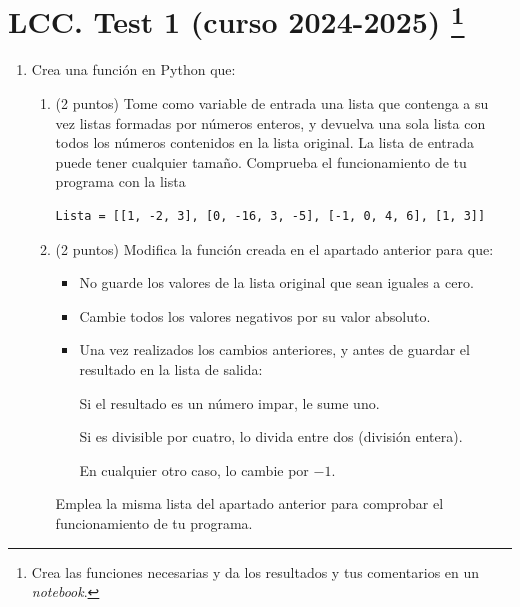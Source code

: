 \section{LCC. Test 1 (curso 2024-2025) \protect\footnote{Crea las funciones necesarias y da los resultados y tus comentarios en un \emph{notebook}.}}

\begin{enumerate}
	\item Crea una función en Python que:
	\begin{enumerate}
		\item (2 puntos) Tome como variable de entrada una lista que contenga a su vez listas formadas por números enteros, y devuelva una sola lista con todos los números contenidos en la lista original. La lista de entrada puede tener cualquier tamaño. Comprueba el funcionamiento de tu programa con la lista
		\begin{verbatim}
Lista = [[1, -2, 3], [0, -16, 3, -5], [-1, 0, 4, 6], [1, 3]]
		\end{verbatim}

		\item (2 puntos) Modifica la función creada en el apartado anterior para que:
		\begin{itemize}
			\item No guarde los valores de la lista original que sean iguales a cero.
			\item Cambie todos los valores negativos por su valor absoluto.
			\item Una vez realizados los cambios anteriores, y antes de guardar el resultado en la lista de salida:

			Si el resultado es un número impar, le sume uno.

			Si es divisible por cuatro, lo divida entre dos (división entera).

			En cualquier otro caso, lo cambie por $-1$.
		\end{itemize}
		Emplea la misma lista del apartado anterior para comprobar el funcionamiento de tu programa.
	\end{enumerate}


\end{enumerate}

